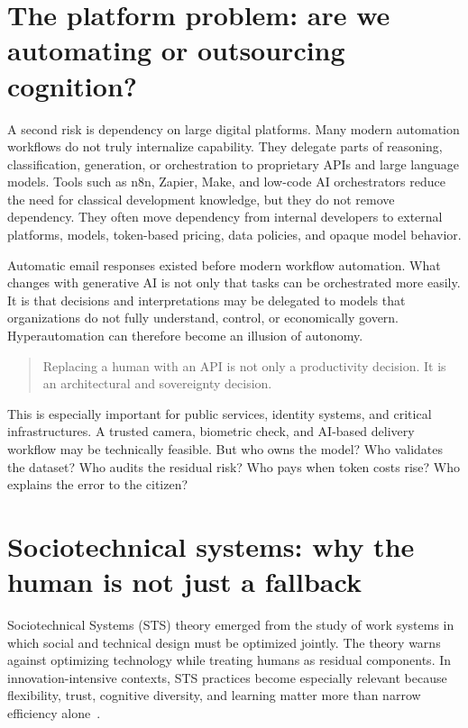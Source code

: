 \documentclass[11pt,a4paper]{article}
\begin{document}
\section{The platform problem: are we automating or outsourcing cognition?}
A second risk is dependency on large digital platforms. Many modern automation workflows do not truly internalize capability. They delegate parts of reasoning, classification, generation, or orchestration to proprietary APIs and large language models. Tools such as n8n, Zapier, Make, and low-code AI orchestrators reduce the need for classical development knowledge, but they do not remove dependency. They often move dependency from internal developers to external platforms, models, token-based pricing, data policies, and opaque model behavior.

Automatic email responses existed before modern workflow automation. What changes with generative AI is not only that tasks can be orchestrated more easily. It is that decisions and interpretations may be delegated to models that organizations do not fully understand, control, or economically govern. Hyperautomation can therefore become an illusion of autonomy.

\begin{quote}
Replacing a human with an API is not only a productivity decision. It is an architectural and sovereignty decision.
\end{quote}

This is especially important for public services, identity systems, and critical infrastructures. A trusted camera, biometric check, and AI-based delivery workflow may be technically feasible. But who owns the model? Who validates the dataset? Who audits the residual risk? Who pays when token costs rise? Who explains the error to the citizen?

\section{Sociotechnical systems: why the human is not just a fallback}
Sociotechnical Systems (STS) theory emerged from the study of work systems in which social and technical design must be optimized jointly. The theory warns against optimizing technology while treating humans as residual components. In innovation-intensive contexts, STS practices become especially relevant because flexibility, trust, cognitive diversity, and learning matter more than narrow efficiency alone \,\citep{trist1981evolution,molleman2001sociotechnical}.
\end{document}
